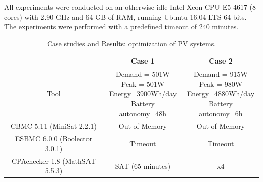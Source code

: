 \documentclass[10pt,conference]{IEEEtran}
\begin{document}
All experiments were conducted on an otherwise idle Intel Xeon CPU E5-4617 (8-cores) with 2.90 GHz and 64 GB of RAM, running Ubuntu 16.04 LTS 64-bits. The experiments were performed with a predefined timeout of 240 minutes.

\begin{table}
\caption{Case studies and Results: optimization of PV systems.}\label{tab1}
\begin{scriptsize}
\begin{tabular}{|c|c|c|}
\hline
\hline
 & Case 1 & Case 2\\
\hline
\hline
Tool & \makecell{Demand = 501W \\ Peak = 501W \\ Energy=3900Wh/day \\ Battery autonomy=48h} & \makecell{Demand = 915W \\ Peak = 980W \\ Energy=4880Wh/day \\ Battery autonomy=6h}\\
\hline
CBMC 5.11 (MiniSat 2.2.1) & Out of Memory & Out of Memory \\
\hline
ESBMC 6.0.0 (Boolector 3.0.1) & Timeout & Timeout \\
\hline
CPAchecker 1.8 (MathSAT 5.5.3) & SAT (65 minutes) & x4 \\
\hline
\hline
\end{tabular}
\end{scriptsize}
\end{table}

{}

\vspace{12pt}
\end{document}
